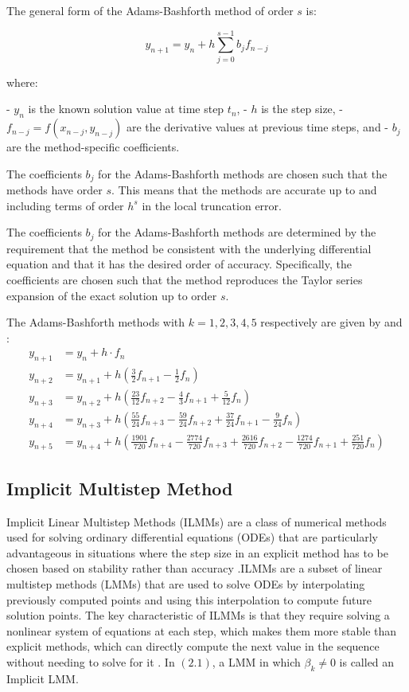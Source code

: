 The general form of the Adams-Bashforth method of order $s$ is:

\begin{equation}
  y_{n+1} = y_n + h \sum_{j=0}^{s-1} b_j f_{n-j}
\end{equation}


where:

- $y_n$ is the known solution value at time step $t_n$,
- $h$ is the step size,
- $f_{n-j} = f(x_{n-j}, y_{n-j})$ are the derivative values at previous time steps, and
- $b_j$ are the method-specific coefficients.

The coefficients $b_j$ for the Adams-Bashforth methods are chosen such that the methods have order $s$. This means that the methods are accurate up to and including terms of order $h^s$ in the local truncation error.

The coefficients $b_j$ for the Adams-Bashforth methods are determined by the requirement that the method be consistent with the underlying differential equation and that it has the desired order of accuracy. Specifically, the coefficients are chosen such that the method reproduces the Taylor series expansion of the exact solution up to order $s$.

The Adams-Bashforth methods with $k=1,2,3,4,5$ respectively are given by \cite{butcher2003numerical} and \cite{hairer1993solving}:
\begin{align}
  y_{n+1} & = y_n + h \cdot f_n \\
  y_{n+2} & = y_{n+1} + h \left(\frac{3}{2}f_{n+1} - \frac{1}{2}f_{n}\right) \\
  y_{n+3} & = y_{n+2} + h \left(\frac{23}{12}f_{n+2} - \frac{4}{3}f_{n+1} + \frac{5}{12}f_{n}\right) \\
  y_{n+4} & = y_{n+3} + h \left(\frac{55}{24}f_{n+3} - \frac{59}{24}f_{n+2} + \frac{37}{24}f_{n+1} - \frac{9}{24}f_{n}\right) \\
  y_{n+5} & = y_{n+4} + h \left(\frac{1901}{720}f_{n+4} - \frac{2774}{720}f_{n+3} + \frac{2616}{720}f_{n+2} - \frac{1274}{720}f_{n+1} + \frac{251}{720}f_{n}\right)
\end{align}


\subsection{Implicit Multistep Method}
Implicit Linear Multistep Methods (ILMMs) are a class of numerical methods used for solving ordinary differential equations (ODEs) that are particularly advantageous in situations where the step size in an explicit method has to be chosen based on stability rather than accuracy \cite{alexander}.ILMMs are a subset of linear multistep methods (LMMs) that are used to solve ODEs by interpolating previously computed points and using this interpolation to compute future solution points. The key characteristic of ILMMs is that they require solving a nonlinear system of equations at each step, which makes them more stable than explicit methods, which can directly compute the next value in the sequence without needing to solve for it \cite{keller2020discovery}. In $(2.1)$, a LMM in which $\beta_k \neq 0$ is called an Implicit LMM.

